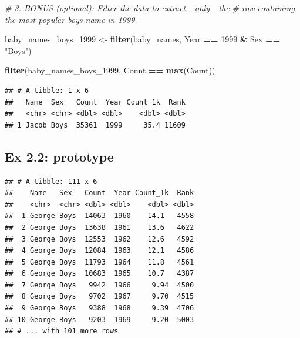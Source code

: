 \documentclass[]{book}
\newenvironment{Shaded}{\begin{snugshade}}{\end{snugshade}}
\newcommand{\CommentTok}[1]{\textcolor[rgb]{0.56,0.35,0.01}{\textit{#1}}}
\newcommand{\DecValTok}[1]{\textcolor[rgb]{0.00,0.00,0.81}{#1}}
\newcommand{\KeywordTok}[1]{\textcolor[rgb]{0.13,0.29,0.53}{\textbf{#1}}}
\newcommand{\NormalTok}[1]{#1}
\newcommand{\OperatorTok}[1]{\textcolor[rgb]{0.81,0.36,0.00}{\textbf{#1}}}
\newcommand{\StringTok}[1]{\textcolor[rgb]{0.31,0.60,0.02}{#1}}
\begin{document}
\begin{Shaded}
\begin{Highlighting}[]
\CommentTok{# 3.  BONUS (optional): Filter the data to extract _only_ the }
\CommentTok{#     row containing the most popular boys name in 1999.}

\NormalTok{baby_names_boys_}\DecValTok{1999}\NormalTok{ <-}\StringTok{ }\KeywordTok{filter}\NormalTok{(baby_names, }
\NormalTok{                    Year }\OperatorTok{==}\StringTok{ }\DecValTok{1999} \OperatorTok{&}\StringTok{ }\NormalTok{Sex }\OperatorTok{==}\StringTok{ "Boys"}\NormalTok{)}
\end{Highlighting}
\end{Shaded}

\begin{Shaded}
\begin{Highlighting}[]
\KeywordTok{filter}\NormalTok{(baby_names_boys_}\DecValTok{1999}\NormalTok{, Count }\OperatorTok{==}\StringTok{ }\KeywordTok{max}\NormalTok{(Count))}
\end{Highlighting}
\end{Shaded}

\begin{verbatim}
## # A tibble: 1 x 6
##   Name  Sex   Count  Year Count_1k  Rank
##   <chr> <chr> <dbl> <dbl>    <dbl> <dbl>
## 1 Jacob Boys  35361  1999     35.4 11609
\end{verbatim}

\hypertarget{ex-2.2-prototype}{%
\subsection{Ex 2.2: prototype}\label{ex-2.2-prototype}}

\begin{Shaded}
\end{Shaded}

\begin{verbatim}
## # A tibble: 111 x 6
##    Name   Sex   Count  Year Count_1k  Rank
##    <chr>  <chr> <dbl> <dbl>    <dbl> <dbl>
##  1 George Boys  14063  1960    14.1   4558
##  2 George Boys  13638  1961    13.6   4622
##  3 George Boys  12553  1962    12.6   4592
##  4 George Boys  12084  1963    12.1   4586
##  5 George Boys  11793  1964    11.8   4561
##  6 George Boys  10683  1965    10.7   4387
##  7 George Boys   9942  1966     9.94  4500
##  8 George Boys   9702  1967     9.70  4515
##  9 George Boys   9388  1968     9.39  4706
## 10 George Boys   9203  1969     9.20  5003
## # ... with 101 more rows
\end{verbatim}
\end{document}
